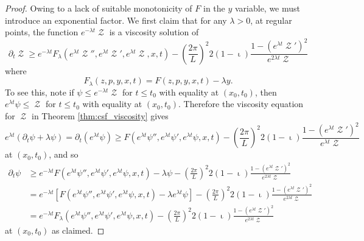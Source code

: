 \documentclass[11pt]{amsart}
\DeclareMathOperator{\chordarcprofile}{\mathcal{Z}}
\DeclareMathOperator{\tangindicator}{\iota}
\begin{document}
\begin{proof}
Owing to a lack of suitable monotonicity of $F$ in the $y$ variable, we must introduce an exponential factor. We first claim that for any $\lambda > 0$, at regular points, the function $e^{-\lambda t} \chordarcprofile$ is a viscosity solution of
\begin{equation}
\label{eq:exponential_viscosity}
\partial_t \chordarcprofile \geq e^{-\lambda t} F_{\lambda} (e^{\lambda t} \chordarcprofile'', e^{\lambda t} \chordarcprofile', e^{\lambda t} \chordarcprofile, x, t) - \left(\frac{2\pi}{L}\right)^2 2 (1-\tangindicator) \frac{1 - (e^{\lambda t} \chordarcprofile')^2}{e^{2\lambda t} \chordarcprofile}
\end{equation}
where
\[
F_{\lambda}(z, p, y, x, t) = F(z, p, y, x, t) - \lambda y.
\]
To see this, note if $\psi \leq e^{-\lambda t} \chordarcprofile$ for $t\leq t_0$ with equality at $(x_0, t_0)$, then $e^{\lambda t} \psi \leq \chordarcprofile$ for $t\leq t_0$ with equality at $(x_0, t_0)$. Therefore the viscosity equation for $\chordarcprofile$ in Theorem \ref{thm:csf_viscosity} gives
\[
e^{\lambda t} (\partial_t \psi + \lambda \psi) = \partial_t (e^{\lambda t} \psi) \geq F(e^{\lambda t} \psi'', e^{\lambda t} \psi', e^{\lambda t} \psi, x, t) - \left(\frac{2\pi}{L}\right)^2 2 (1-\tangindicator) \frac{1 - (e^{\lambda t} \chordarcprofile')^2}{e^{\lambda t} \chordarcprofile}
\]
at $(x_0, t_0)$, and so
\[
\begin{split}
\partial_t \psi &\geq e^{-\lambda t} F(e^{\lambda t} \psi'', e^{\lambda t} \psi', e^{\lambda t} \psi, x, t) - \lambda \psi - \left(\frac{2\pi}{L}\right)^2 2 (1-\tangindicator) \frac{1 - (e^{\lambda t} \chordarcprofile')^2}{e^{2\lambda t} \chordarcprofile} \\
&= e^{-\lambda t} \left[F(e^{\lambda t} \psi'', e^{\lambda t} \psi', e^{\lambda t} \psi, x, t) - \lambda e^{\lambda t} \psi\right] - \left(\frac{2\pi}{L}\right)^2 2 (1-\tangindicator) \frac{1 - (e^{\lambda t} \chordarcprofile')^2}{e^{2\lambda t} \chordarcprofile} \\
&= e^{-\lambda t} F_{\lambda}(e^{\lambda t} \psi'', e^{\lambda t} \psi', e^{\lambda t} \psi, x, t) - \left(\frac{2\pi}{L}\right)^2 2 (1-\tangindicator) \frac{1 - (e^{\lambda t} \chordarcprofile')^2}{e^{2\lambda t} \chordarcprofile}
\end{split}
\]
at $(x_0, t_0)$ as claimed.


\end{proof}
\end{document}
